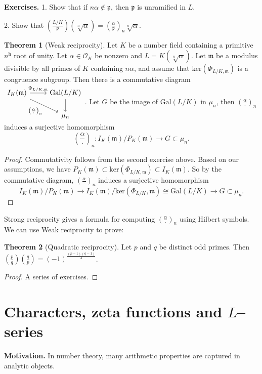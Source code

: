 \documentclass{article}
\theoremstyle{definition}
\newtheorem{theorem}{Theorem}[section]
\begin{document}
\textbf{Exercises.} 1. Show that if $n \alpha \not\in \mathfrak{p}$, then $\mathfrak{p}$ is unramified in $L$.
\vspace{1mm}
 
2. Show that $\left(\frac{L/K}{\mathfrak{p}}\right)(\sqrt[n]{\alpha}) = \left(\frac{\alpha}{\mathfrak{p}}\right)_n \sqrt[n]{\alpha}$.

\begin{theorem}[Weak reciprocity]
    Let $K$ be a number field containing a primitive $n^{\text{h}}$ root of unity. Let $\alpha \in \mathcal{O}_K$ be nonzero and $L = K(\sqrt[n]{\alpha})$. Let $\mathfrak{m}$ be a modulus divisible by all primes of $K$ containing $n \alpha$, and assume that $\text{ker}(\Phi_{L/K,\mathfrak{m}})$ is a congruence subgroup. Then there is a commutative diagram $\begin{tikzcd}[]
        I_K(\mathfrak{m}) & \text{Gal}(L/K)\\
         & \mu_n
        \arrow["\Phi_{L/K,\mathfrak{m}}", from=1-1, to=1-2]
        \arrow["", from=1-2, to=2-2]
        \arrow["\left(\frac{\alpha}{\cdot }\right)_n", from=1-1, to=2-2, swap]
    \end{tikzcd}$. 
    Let $G$ be the image of $\text{Gal}(L/K)$ in $\mu_n$, then $\left(\frac{\alpha}{\cdot }\right)_n$ induces a surjective homomorphism \[
    \left(\frac{\alpha}{\cdot }\right)_n : I_K(\mathfrak{m})/P_K(\mathfrak{m}) \to G \subset \mu_n.
    \]
\end{theorem}
\begin{proof}
    Commutativity follows from the second exercise above. Based on our assumptions, we have $P_K(\mathfrak{m}) \subset \text{ker}(\Phi_{L/K,\mathfrak{m}}) \subset I_K(\mathfrak{m})$. So by the commutative diagram, $\left(\frac{\alpha}{\cdot }\right)_n$ induces a surjective homomorphism $$I_K(\mathfrak{m})/P_K(\mathfrak{m}) \to I_K(\mathfrak{m})/\text{ker}(\Phi_{L/K},\mathfrak{m}) \cong \text{Gal}(L/K) \to G \subset \mu_n.$$
\end{proof}
Strong reciprocity gives a formula for computing $\left(\frac{\alpha}{\cdot }\right)_n$ using Hilbert symbols. We can use Weak reciprocity to prove:
\begin{theorem}[Quadratic reciprocity]
    Let $p$ and $q$ be distinct odd primes. Then $\left(\frac{p}{q}\right)\left(\frac{q}{p}\right) = (-1)^{\frac{(p-1)(q-1)}{4}}$.
\end{theorem}
\begin{proof}
    A series of exercises.
\end{proof}
\section{Characters, zeta functions and $L$--series}
\textbf{Motivation.} In number theory, many arithmetic properties are captured in analytic objects.
\end{document}
